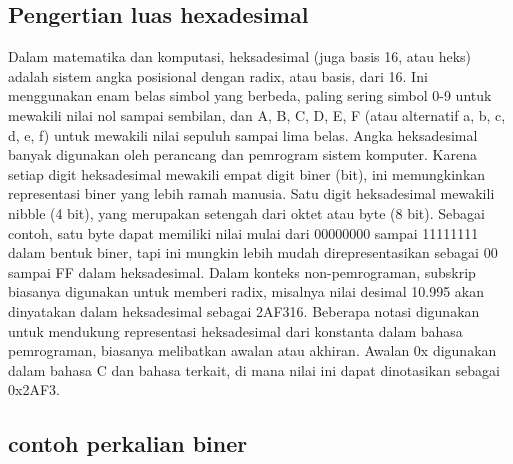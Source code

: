 \subsection{Pengertian luas hexadesimal}
Dalam matematika dan komputasi, heksadesimal (juga basis 16, atau heks) adalah sistem angka posisional dengan radix, atau basis, dari 16. Ini 
menggunakan enam belas simbol yang berbeda, paling sering simbol 0-9 untuk mewakili nilai nol sampai sembilan, dan A, B, C, D, E, F (atau 
alternatif a, b, c, d, e, f) untuk mewakili nilai sepuluh sampai lima belas. Angka heksadesimal banyak digunakan oleh perancang dan pemrogram 
sistem komputer. Karena setiap digit heksadesimal mewakili empat digit biner (bit), ini memungkinkan representasi biner yang lebih ramah manusia. 
Satu digit heksadesimal mewakili nibble (4 bit), yang merupakan setengah dari oktet atau byte (8 bit). Sebagai contoh, satu byte dapat memiliki 
nilai mulai dari 00000000 sampai 11111111 dalam bentuk biner, tapi ini mungkin lebih mudah direpresentasikan sebagai 00 sampai FF dalam heksadesimal.
Dalam konteks non-pemrograman, subskrip biasanya digunakan untuk memberi radix, misalnya nilai desimal 10.995 akan dinyatakan dalam heksadesimal 
sebagai 2AF316. Beberapa notasi digunakan untuk mendukung representasi heksadesimal dari konstanta dalam bahasa pemrograman, biasanya melibatkan 
awalan atau akhiran. Awalan 0x digunakan dalam bahasa C dan bahasa terkait, di mana nilai ini dapat dinotasikan sebagai 0x2AF3.

\subsection{contoh perkalian biner}

